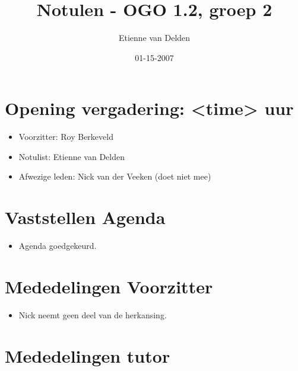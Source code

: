 \documentclass[]{article}
\title{Notulen - OGO 1.2, groep 2}
\author{ Etienne van Delden \\ }
\date{01-15-2007}
\begin{document}
\ifpdf
{}
\else
{}
\fi

\maketitle


\section{Opening vergadering: <time> uur }
  \begin{itemize}
    \item Voorzitter: Roy Berkeveld
    \item Notulist: Etienne van Delden
    \item Afwezige leden: Nick van der Veeken (doet niet mee)
  \end{itemize}




\section{Vaststellen Agenda}

  \begin{itemize}
     \item Agenda goedgekeurd.
  \end{itemize}


\section{Mededelingen Voorzitter}

  \begin{itemize}
     \item Nick neemt geen deel van de herkansing.
  \end{itemize}

\section{Mededelingen tutor}
\end{document}
